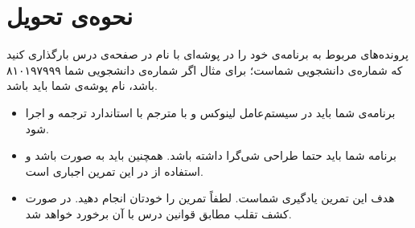 \documentclass{utap}
\begin{document}
	\section{نحوه‌ی تحویل}
		پرونده‌‌های مربوط به برنامه‌ی خود را در پوشه‌ای با نام  در صفحه‌ی  درس بارگذاری کنید که  شماره‌ی دانشجویی شماست؛ برای مثال اگر شماره‌ی دانشجویی شما ۸۱۰۱۹۷۹۹۹ باشد، نام پوشه‌ی شما باید  باشد.
		\begin{itemize}
			\item
						برنامه‌ی شما باید در سیستم‌عامل لینوکس و با مترجم  با استاندارد  ترجمه و اجرا شود.
					\item
						برنامه شما باید حتما طراحی شی‌گرا داشته باشد. همچنین باید به صورت  باشد و استفاده از  در این تمرین اجباری است.
					\item
						هدف این تمرین یادگیری شماست. لطفاً تمرین را خودتان انجام دهید. در صورت کشف تقلب مطابق قوانین درس با آن برخورد خواهد شد.
		\end{itemize}
\end{document}
